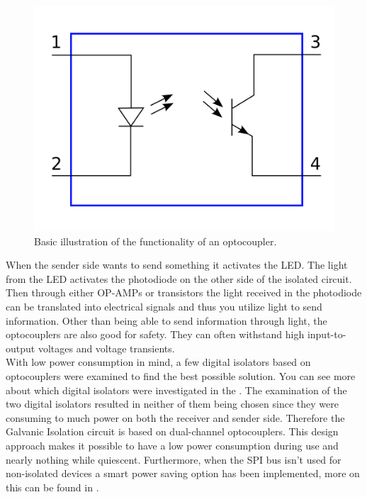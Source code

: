 \begin{figure}[H]
	\centering
	\includegraphics[width=0.5\linewidth]{Hardware/Pictures/BMSoptocoup}
	\caption[Empty]{Basic illustration of the functionality of an optocoupler\footnotemark.}
	\label{fig:BMSoptocoup}
\end{figure}

When the sender side wants to send something it activates the LED. The light from the LED activates the photodiode on the other side of the isolated circuit. Then through either OP-AMPs or transistors the light received in the photodiode can be translated into electrical signals and thus you utilize light to send information. Other than being able to send information through light, the optocouplers are also good for safety. They can often withstand high input-to-output voltages and voltage transients. \\
With low power consumption in mind, a few digital isolators based on optocouplers were examined to find the best possible solution. You can see more about which digital isolators were investigated in the . The examination of the two digital isolators resulted in neither of them being chosen since they were consuming to much power on both the receiver and sender side. Therefore the Galvanic Isolation circuit is based on dual-channel optocouplers. This design approach makes it possible to have a low power consumption during use and nearly nothing while quiescent. Furthermore, when the SPI bus isn't used for non-isolated devices a smart power saving option has been implemented, more on this can be found in .

